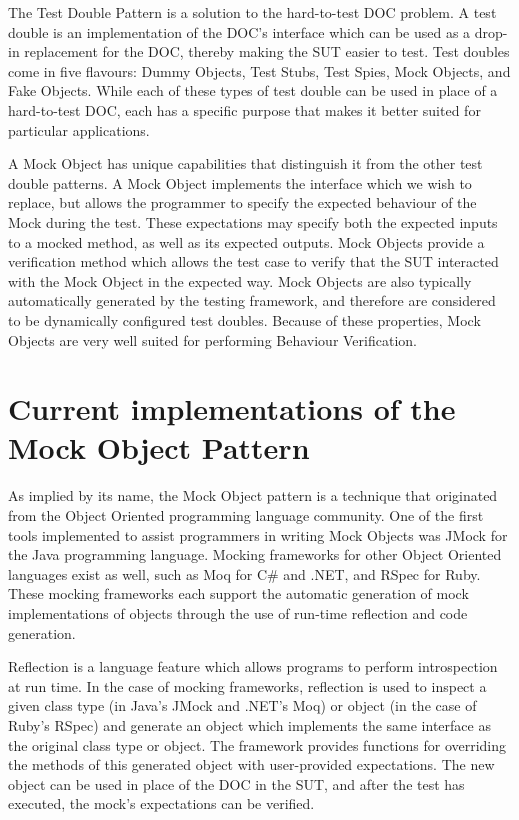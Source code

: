 The Test Double Pattern is a solution to the hard-to-test DOC
problem. A test double is an implementation of the DOC's interface
which can be used as a drop-in replacement for the DOC, thereby making
the SUT easier to test. Test doubles come in five flavours: Dummy
Objects, Test Stubs, Test Spies, Mock Objects, and Fake Objects. While
each of these types of test double can be used in place of a
hard-to-test DOC, each has a specific purpose that makes it better
suited for particular applications.

A Mock Object has unique capabilities that distinguish it from the
other test double patterns. A Mock Object implements the interface
which we wish to replace, but allows the programmer to specify the
expected behaviour of the Mock during the test. These expectations may
specify both the expected inputs to a mocked method, as well as its
expected outputs. Mock Objects provide a verification method which
allows the test case to verify that the SUT interacted with the Mock
Object in the expected way. Mock Objects are also typically
automatically generated by the testing framework, and therefore are
considered to be dynamically configured test doubles. Because of these
properties, Mock Objects are very well suited for performing Behaviour
Verification.

\section{Current implementations of the Mock Object Pattern}

As implied by its name, the Mock Object pattern is a technique that
originated from the Object Oriented programming language
community. One of the first tools implemented to assist programmers in
writing Mock Objects was JMock \cite{www:jmock} for the Java
programming language. Mocking frameworks for other Object Oriented
languages exist as well, such as Moq \cite{www:moq} for C\# and .NET,
and RSpec \cite{www:rspec} for Ruby. These mocking frameworks each
support the automatic generation of mock implementations of objects
through the use of run-time reflection and code generation.


Reflection is a language feature which allows programs to perform
introspection at run time. In the case of mocking frameworks,
reflection is used to inspect a given class type (in Java's JMock and
.NET's Moq) or object (in the case of Ruby's RSpec) and generate an
object which implements the same interface as the original class type
or object. The framework provides functions for overriding the methods
of this generated object with user-provided expectations. The new
object can be used in place of the DOC in the SUT, and after the test
has executed, the mock's expectations can be verified.

